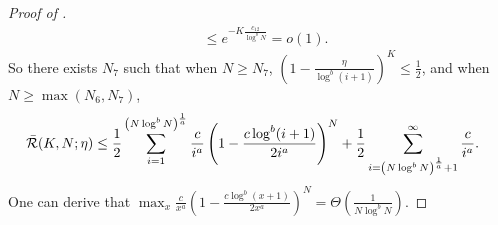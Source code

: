 \begin{proof}[Proof of ]
\begin{align*}
    &\leq e^{-K\frac{c_{12}}{\log^{b} N}} = o(1).
\end{align*} 
So there exists $N_7$ such that when $N\geq N_7$, $\left(1-\frac{\eta}{\log^b (i+1)}\right)^K \leq \frac{1}{2}$, and when $N\geq\max(N_6, N_7)$,
\begin{align*}
    \bar{\mathcal{R}}(K,N;\eta)
    &\leq \frac{1}{2}\sum_{i=1}^{\left(N\log^b N\right)^{\frac{1}{a}}}\frac{c}{i^{a}}\left(1-\frac{c\log^b (i+1)}{2i^{a}}\right)^N+\frac{1}{2}\sum_{i=\left(N\log^b N\right)^{\frac{1}{a}}+1}^{\infty}\frac{c}{i^{a}}.
\end{align*}
One can derive that $\max_x\frac{c}{x^{a}}\left(1-\frac{c\log^b (x+1)}{2x^{a}}\right)^N = \Theta\left(\frac{1}{N\log^bN}\right)$.


\end{proof}
